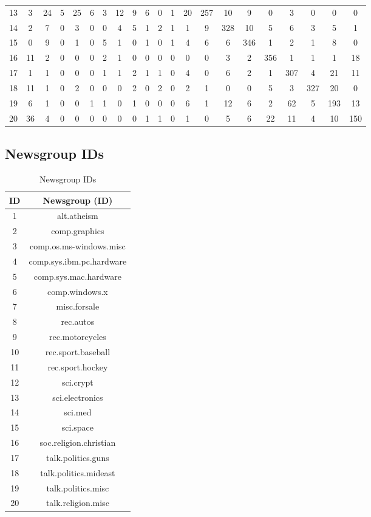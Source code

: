 \documentclass{IEEEtran}
\begin{document}
\begin{table}[ht]
\begin{tabular}{c c c c c c c c c c c c c c c c c c c c c}
    13 &   3 &  24 &   5 &  25 &6&3&12&9&6&0&1&20&257&10&9&0&3&0&0&0 \\
    14 &   2 &   7 &   0 &   3 &0&0&4&5&1&2&1&1&9&328&10&5&6&3&5&1 \\
    15 &   0 &   9 &   0 &   1 &0&5&1&0&1&0&1&4&6&6&346&1&2&1&8&0 \\
    16 &  11 &   2 &   0 &   0 &0&2&1&0&0&0&0&0&0&3&2&356&1&1&1&18 \\
    17 &   1 &   1 &   0 &   0 &0&1&1&2&1&1&0&4&0&6&2&1&307&4&21&11 \\
    18 &  11 &   1 &   0 &   2 &0&0&0&2&0&2&0&2&1&0&0&5&3&327&20&0 \\
    19 &   6 &   1 &   0 &   0 &1&1&0&1&0&0&0&6&1&12&6&2&62&5&193&13 \\
    20 &  36 &   4 &   0 &   0 &0&0&0&0&1&1&0&1&0&5&6&22&11&4&10&150 \\
    \hline
  \end{tabular}
  \label{table:confmatrix}
\end{table}

\subsection{Newsgroup IDs}

\begin{table}[ht]
  \caption{Newsgroup IDs}
  \centering
  \begin{tabular}{c c }
  \hline\hline
  ID & Newsgroup (ID) \\ [0.5ex]
  \hline
   1 & alt.atheism \\
   2 & comp.graphics \\
   3 & comp.os.ms-windows.misc \\
   4 & comp.sys.ibm.pc.hardware \\
   5 & comp.sys.mac.hardware \\
   6 & comp.windows.x \\
   7 & misc.forsale \\
   8 & rec.autos \\
   9 & rec.motorcycles \\
  10 & rec.sport.baseball \\
  11 & rec.sport.hockey \\
  12 & sci.crypt \\
  13 & sci.electronics \\
  14 & sci.med \\
  15 & sci.space \\
  16 & soc.religion.christian \\
  17 & talk.politics.guns \\
  18 & talk.politics.mideast \\
  19 & talk.politics.misc \\
  20 & talk.religion.misc \\

  \hline
  \end{tabular}
  \label{table:newsgroupids}
\end{table}
\end{document}
